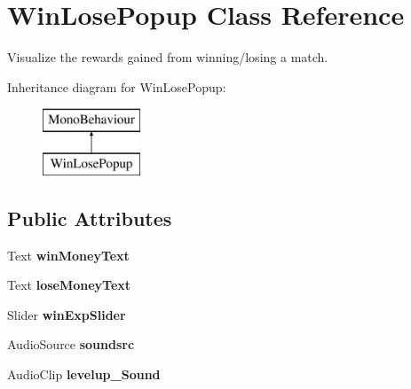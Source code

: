 \hypertarget{class_win_lose_popup}{}\section{Win\+Lose\+Popup Class Reference}
\label{class_win_lose_popup}


Visualize the rewards gained from winning/losing a match.  


Inheritance diagram for Win\+Lose\+Popup\+:\begin{figure}[H]
\begin{center}
\leavevmode
\includegraphics[height=2.000000cm]{class_win_lose_popup}
\end{center}
\end{figure}
\subsection*{Public Attributes}
\begin{DoxyCompactItemize}
\item 
\mbox{\label{class_win_lose_popup_a96b5a5d480b14cdae7e5a882bee30757}} 
Text {\bfseries win\+Money\+Text}
\item 
\mbox{\label{class_win_lose_popup_adbe5b4c1578b28ae3a6bc4993407a739}} 
Text {\bfseries lose\+Money\+Text}
\item 
\mbox{\label{class_win_lose_popup_a68c25472f6b7101d6995dd57b6aa6803}} 
Slider {\bfseries win\+Exp\+Slider}
\item 
\mbox{\label{class_win_lose_popup_a7f104ba616010ea3714c5abc1306e6de}} 
Audio\+Source {\bfseries soundsrc}
\item 
\mbox{\label{class_win_lose_popup_a1f35c7e6dea70e8dba042d4703768d8d}} 
Audio\+Clip {\bfseries levelup\+\_\+\+Sound}
\end{DoxyCompactItemize}
